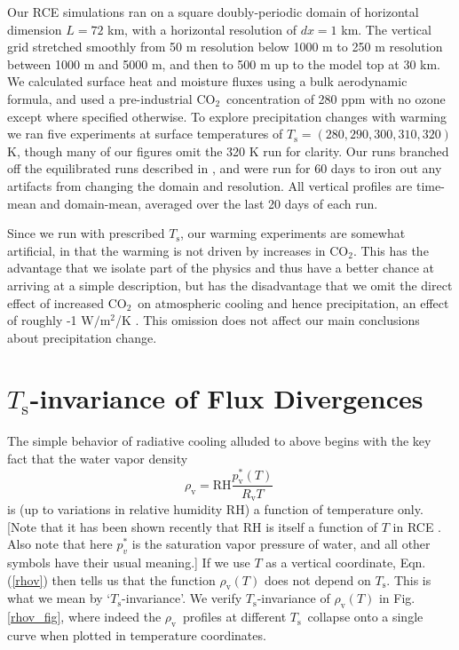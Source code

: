 \documentclass[10pt]{article}
\newcommand{\beqn}{\begin{equation}}
\newcommand{\eeqn}{\end{equation}}
\newcommand{\eqnref}[1]{(\ref{#1})}
\newcommand{\cotwo}{\ensuremath{\mathrm{CO_2}}}
\newcommand{\Wmsq}{\ensuremath{\mathrm{W/m^2}}}
\newcommand{\rhov}{\ensuremath{\rho_\mathrm{v}}}
\newcommand{\Rv}{\ensuremath{R_\mathrm{v}}}
\newcommand{\pvstar}{\ensuremath{p^*_{\mathrm{v}}}}
\newcommand{\Ts}{\ensuremath{T_\mathrm{s}}}
\newcommand{\RH}{\ensuremath{\mathrm{RH}}}
\begin{document}
	
	Our RCE simulations ran on a square doubly-periodic domain of horizontal dimension $L=72$ km, with  a horizontal resolution of $dx=1$ km. The vertical grid stretched smoothly from 50 m resolution below 1000 m to 250 m resolution between 1000 m and 5000 m, and then to 500 m up to the model top at  30 km. We calculated surface heat and moisture fluxes using a bulk aerodynamic formula, and used a pre-industrial \cotwo\  concentration of 280 ppm with no ozone except where specified otherwise. To explore precipitation changes  with warming we ran five experiments at surface temperatures of $\Ts=(280,290,300,310,320)$ K, though many of our figures omit the 320 K run for clarity. Our runs branched off the equilibrated runs described in \cite{romps2014}, and were run for 60 days  to iron out any artifacts from changing the domain and resolution. All vertical profiles are time-mean and domain-mean, averaged over the last 20 days of each run. 

Since we run with prescribed \Ts, our warming experiments are somewhat artificial, in that the warming is not driven by increases in \cotwo. This has the advantage that we isolate part of the physics and thus have a better chance at arriving at a simple description, but has the disadvantage that we omit the direct effect of increased \cotwo\ on atmospheric cooling and hence precipitation, an effect of roughly -1 \Wmsq/K \citep{pendergrass2014}. This omission does not affect our main conclusions about precipitation change.



\section{\Ts-invariance of Flux Divergences}
\label{Ts_invariance}
The simple behavior of radiative cooling alluded to above begins with the key fact that  the water vapor density 
	\beqn
		\rhov =  \RH\frac{\pvstar(T)}{\Rv T} \; 
	\label{rhov}
	\eeqn
	 is (up to variations in relative humidity \RH) a function of temperature only. [Note that it has been shown recently that RH is itself a function of $T$ in RCE \citep{romps2014}. Also note that here $p_v^*$  is the saturation vapor pressure of water, and all other symbols have their usual meaning.] If we use $T$ as a vertical coordinate,  Eqn. \eqnref{rhov} then tells us that the function $\rhov(T)$ does not depend on \Ts. This is what we mean by `\Ts-invariance'. We verify \Ts-invariance of $\rhov(T)$  in Fig. \ref{rhov_fig}, where indeed  the \rhov\ profiles at different \Ts\ collapse onto a single curve when plotted in temperature coordinates.
\end{document}
